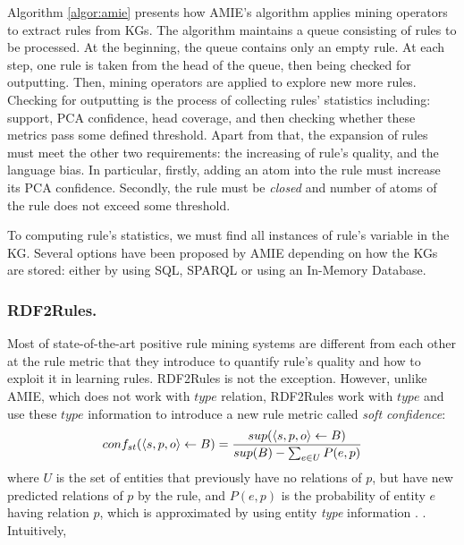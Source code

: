 Algorithm \ref{algor:amie} presents how AMIE's algorithm applies mining operators to extract rules from KGs. The algorithm maintains a queue consisting of rules to be processed. At the beginning, the queue contains only an empty rule. At each step, one rule is taken from the head of the queue, then being checked for outputting. Then, mining operators are applied to explore new more rules.
Checking for outputting is the process of collecting rules' statistics including: support, PCA confidence, head coverage, and then checking whether these metrics pass some defined threshold. Apart from that, the expansion of rules must meet the other two requirements: the increasing of rule's quality, and the language bias. In particular, firstly, adding an atom into the rule must increase its PCA confidence. Secondly, the rule must be \textit{closed} and number of atoms of the rule does not exceed some threshold.

To computing rule's statistics, we must find all instances of rule's variable in the KG. Several options have been proposed by AMIE depending on how the KGs are stored: either by using SQL, SPARQL \cite{amie} or using an In-Memory Database.

\subsubsection{RDF2Rules.}
Most of state-of-the-art positive rule mining systems are different from each other at the rule metric that they introduce to quantify rule's quality and how to exploit it in learning rules. RDF2Rules is not the exception. However, unlike AMIE, which does not work with $type$ relation, RDF2Rules \cite{rdf2rules} work with $type$ and use these $type$ information to  introduce a new rule metric called \textit{soft confidence}:
\[conf_{st}(\langle s,p,o\rangle \leftarrow B) = \frac{sup(\langle s,p,o\rangle \leftarrow B)}{sup(B) - \sum_{e \in U}P(e,p)} \]
where $U$ is the set of entities that previously have no relations of $p$, but have new predicted relations of $p$ by the rule, and $P(e,p)$ is the probability of entity $e$ having relation $p$, which is approximated by using entity \textit{type} information \cite{rdf2rules}. . Intuitively, 

